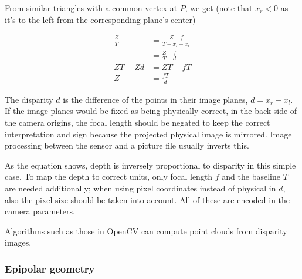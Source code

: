 From similar triangles with a common vertex at $P$, we get (note that $x_r < 0$ as it's to the left from the corresponding plane's center)

\begin{align}
	\frac{Z}{T} &= \frac{Z-f}{T - x_l + x_r} \\
	&= \frac{Z-f}{T - d}\\
	ZT - Zd &= ZT - fT\\
	Z &= \frac{fT}{d}
\end{align}

The disparity $d$ is the difference of the points in their image planes, $d = x_r - x_l$.
If the image planes would be fixed as being physically correct, in the back side of the camera origins, the focal length should be negated to keep the correct interpretation and sign because the projected physical image is mirrored. Image processing between the sensor and a picture file usually inverts this.

As the equation shows, depth is inversely proportional to disparity in this simple case.
To map the depth to correct units, only focal length $f$ and the baseline $T$ are needed additionally; when using pixel coordinates instead of physical in $d$, also the pixel size should be taken into account.
All of these are encoded in the camera parameters.

Algorithms such as those in OpenCV can compute point clouds from disparity images.

\subsubsection{Epipolar geometry}
\cite{trucco1998introductory,hartley03multiview}

